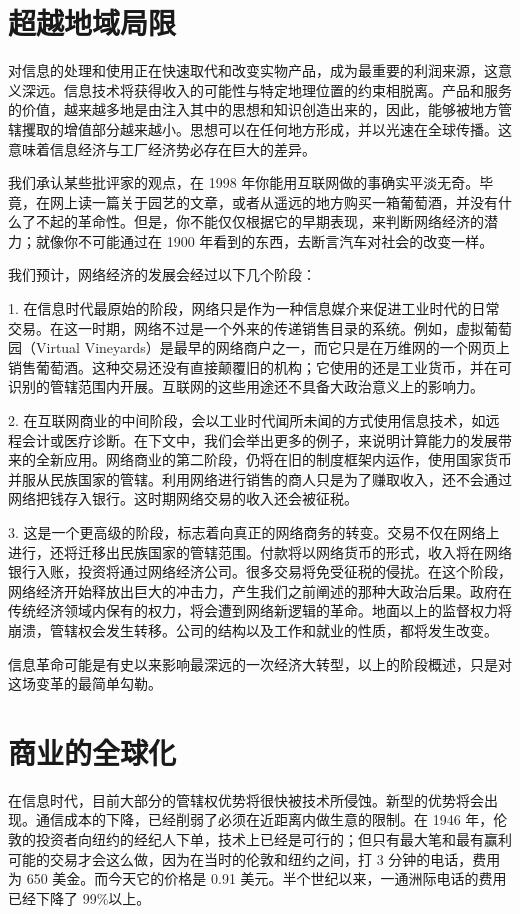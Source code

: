 \section{超越地域局限}
对信息的处理和使用正在快速取代和改变实物产品，成为最重要的利润来源，这意义深远。信息技术将获得收入的可能性与特定地理位置的约束相脱离。产品和服务的价值，越来越多地是由注入其中的思想和知识创造出来的，因此，能够被地方管辖攫取的增值部分越来越小。思想可以在任何地方形成，并以光速在全球传播。这意味着信息经济与工厂经济势必存在巨大的差异。

我们承认某些批评家的观点，在 1998 年你能用互联网做的事确实平淡无奇。毕竟，在网上读一篇关于园艺的文章，或者从遥远的地方购买一箱葡萄酒，并没有什么了不起的革命性。但是，你不能仅仅根据它的早期表现，来判断网络经济的潜力；就像你不可能通过在 1900 年看到的东西，去断言汽车对社会的改变一样。

我们预计，网络经济的发展会经过以下几个阶段：

1. 在信息时代最原始的阶段，网络只是作为一种信息媒介来促进工业时代的日常交易。在这一时期，网络不过是一个外来的传递销售目录的系统。例如，虚拟葡萄园（Virtual Vineyards）是最早的网络商户之一，而它只是在万维网的一个网页上销售葡萄酒。这种交易还没有直接颠覆旧的机构；它使用的还是工业货币，并在可识别的管辖范围内开展。互联网的这些用途还不具备大政治意义上的影响力。

2. 在互联网商业的中间阶段，会以工业时代闻所未闻的方式使用信息技术，如远程会计或医疗诊断。在下文中，我们会举出更多的例子，来说明计算能力的发展带来的全新应用。网络商业的第二阶段，仍将在旧的制度框架内运作，使用国家货币并服从民族国家的管辖。利用网络进行销售的商人只是为了赚取收入，还不会通过网络把钱存入银行。这时期网络交易的收入还会被征税。

3. 这是一个更高级的阶段，标志着向真正的网络商务的转变。交易不仅在网络上进行，还将迁移出民族国家的管辖范围。付款将以网络货币的形式，收入将在网络银行入账，投资将通过网络经济公司。很多交易将免受征税的侵扰。在这个阶段，网络经济开始释放出巨大的冲击力，产生我们之前阐述的那种大政治后果。政府在传统经济领域内保有的权力，将会遭到网络新逻辑的革命。地面以上的监督权力将崩溃，管辖权会发生转移。公司的结构以及工作和就业的性质，都将发生改变。

信息革命可能是有史以来影响最深远的一次经济大转型，以上的阶段概述，只是对这场变革的最简单勾勒。

\section{商业的全球化}
在信息时代，目前大部分的管辖权优势将很快被技术所侵蚀。新型的优势将会出现。通信成本的下降，已经削弱了必须在近距离内做生意的限制。在 1946 年，伦敦的投资者向纽约的经纪人下单，技术上已经是可行的；但只有最大笔和最有赢利可能的交易才会这么做，因为在当时的伦敦和纽约之间，打 3 分钟的电话，费用为 650 美金。而今天它的价格是 0.91 美元。半个世纪以来，一通洲际电话的费用已经下降了 99\%以上。

